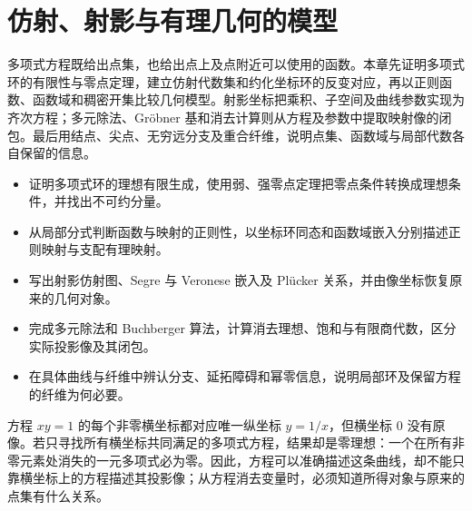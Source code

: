 
% 
% 

\chapter{仿射、射影与有理几何的模型}
\label{g5:ch:01}

\begin{chapterabstract}
	多项式方程既给出点集，也给出点上及点附近可以使用的函数。本章先证明多项式环的有限性与零点定理，建立仿射代数集和约化坐标环的反变对应，再以正则函数、函数域和稠密开集比较几何模型。射影坐标把乘积、子空间及曲线参数实现为齐次方程；多元除法、Gröbner 基和消去计算则从方程及参数中提取映射像的闭包。最后用结点、尖点、无穷远分支及重合纤维，说明点集、函数域与局部代数各自保留的信息。
\end{chapterabstract}

\begin{learninggoals}
	\begin{itemize}
		\item 证明多项式环的理想有限生成，使用弱、强零点定理把零点条件转换成理想条件，并找出不可约分量。
		\item 从局部分式判断函数与映射的正则性，以坐标环同态和函数域嵌入分别描述正则映射与支配有理映射。
		\item 写出射影仿射图、Segre 与 Veronese 嵌入及 Plücker 关系，并由像坐标恢复原来的几何对象。
		\item 完成多元除法和 Buchberger 算法，计算消去理想、饱和与有限商代数，区分实际投影像及其闭包。
		\item 在具体曲线与纤维中辨认分支、延拓障碍和幂零信息，说明局部环及保留方程的纤维为何必要。
	\end{itemize}
\end{learninggoals}

方程 \(xy=1\) 的每个非零横坐标都对应唯一纵坐标 \(y=1/x\)，但横坐标 \(0\) 没有原像。若只寻找所有横坐标共同满足的多项式方程，结果却是零理想：一个在所有非零元素处消失的一元多项式必为零。因此，方程可以准确描述这条曲线，却不能只靠横坐标上的方程描述其投影像；从方程消去变量时，必须知道所得对象与原来的点集有什么关系。

\ProseParagraphBreak

